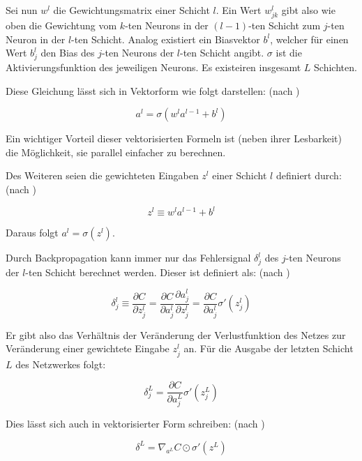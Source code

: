 Sei nun $w^l$ die Gewichtungsmatrix einer Schicht $l$. Ein Wert $w_{jk}^l$ gibt also wie oben die Gewichtung vom $k$-ten Neurons in der $\left(l-1\right)$-ten Schicht zum $j$-ten Neuron in der $l$-ten Schicht. Analog existiert ein Biasvektor $b^l$, welcher für einen Wert $b_j^l$ den Bias des $j$-ten Neurons der $l$-ten Schicht angibt. $\sigma$ ist die Aktivierungsfunktion des jeweiligen Neurons. Es existeiren insgesamt $L$ Schichten.

Diese Gleichung lässt sich in Vektorform wie folgt darstellen: (nach \cite[Kap.~2]{nielsen_15})

\begin{equation}
a^l = \sigma\left(w^l a^{l-1}+b^l\right)
\end{equation}

Ein wichtiger Vorteil dieser vektorisierten Formeln ist (neben ihrer Lesbarkeit) die Möglichkeit, sie parallel einfacher zu berechnen.

Des Weiteren seien die gewichteten Eingaben $z^l$ einer Schicht $l$ definiert durch: (nach \cite[Kap.~2]{nielsen_15})

\begin{equation}
z^l \equiv w^l a^{l-1} + b^l
\end{equation}

Daraus folgt $a^l=\sigma\left(z^l\right)$.

Durch Backpropagation kann immer nur das Fehlersignal $\delta_j^l$ des $j$-ten Neurons der $l$-ten Schicht berechnet werden. Dieser ist definiert als: (nach \cite[Kap.~2]{nielsen_15})

\begin{equation}
\delta_j^l \equiv \frac{\partial C}{\partial z_j^l} = \frac{\partial C}{\partial a_j^l}\frac{\partial a_j^l}{\partial z_j^l} = \frac{\partial C}{\partial a_j^l}\sigma'\left(z_j^l\right)
\end{equation}

Er gibt also das Verhältnis der Veränderung der Verlustfunktion des Netzes zur Veränderung einer gewichtete Eingabe $z_j^l$ an. Für die Ausgabe der letzten Schicht $L$ des Netzwerkes folgt:

\begin{equation}
\delta_j^L = \frac{\partial C}{\partial a_j^L}\sigma'\left(z_j^L\right)
\end{equation}

Dies lässt sich auch in vektorisierter Form schreiben: (nach \cite[Kap.~2]{nielsen_15})

\begin{equation}
\label{eqn:bp1}
\delta^L = \nabla_{a^L} C\odot\sigma'\left(z^L\right)
\end{equation}

